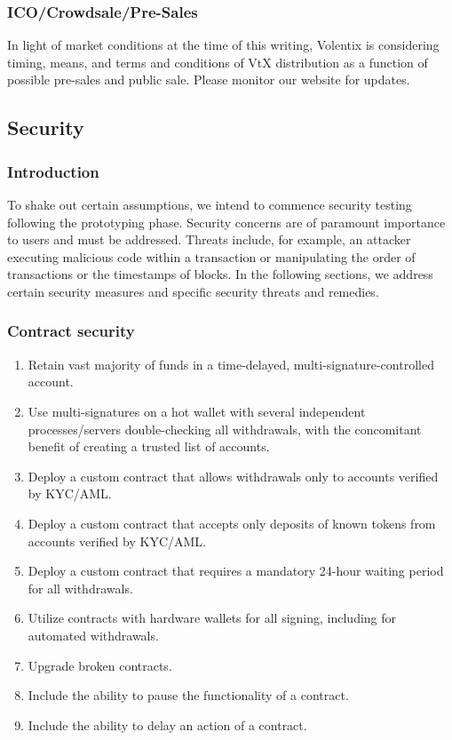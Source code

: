 \documentclass[]{article}
\begin{document}
{\subsubsection {ICO/Crowdsale/Pre-Sales}

In light of market conditions at the time of this writing, Volentix is considering timing, means, and terms and conditions of VtX distribution as a function of possible pre-sales and public sale. Please monitor our website for updates. 


\subsection{Security}
\subsubsection{Introduction}
To shake out certain assumptions, we intend to commence security testing following the prototyping phase.
Security concerns are of paramount importance to users and must be addressed. 
Threats include, for example, an attacker executing malicious code within a transaction or manipulating the order of transactions or the timestamps of blocks. In the following sections, 
we address certain security measures and specific security threats and remedies. 
\subsubsection{Contract security}
\begin{enumerate}
	\item Retain vast majority of funds in a time-delayed, multi-signature-controlled account.
	\item Use multi-signatures on a hot wallet with several independent processes/servers double-checking all withdrawals, with the concomitant benefit of creating a trusted list of accounts.
	\item Deploy a custom contract that allows withdrawals only to accounts verified by KYC/AML.
	\item Deploy a custom contract that accepts only deposits of known tokens from accounts verified by KYC/AML.
	\item Deploy a custom contract that requires a mandatory 24-hour waiting period for all withdrawals.
	\item Utilize contracts with hardware wallets for all signing, including for automated withdrawals.
	\item Upgrade broken contracts.
	\item Include the ability to pause the functionality of a contract.
	\item Include the ability to delay an action of a contract.
\end{enumerate}
}
\end{document}
